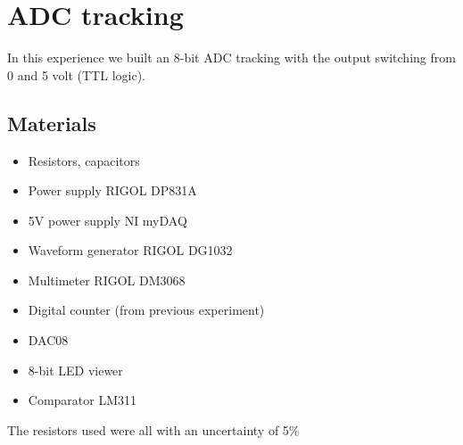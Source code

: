 \chapter{ADC tracking}
In this experience we built an 8-bit ADC tracking with the output switching from 0 and 5 volt (TTL logic).

\section{Materials}
\begin{itemize}
\item Resistors, capacitors
\item Power supply RIGOL DP831A
\item 5V power supply NI myDAQ
\item Waveform generator RIGOL DG1032
\item Multimeter RIGOL DM3068
\item Digital counter (from previous experiment)
\item DAC08
\item 8-bit LED viewer
\item Comparator LM311
\end{itemize}
The resistors used were all with an uncertainty of 5\%

